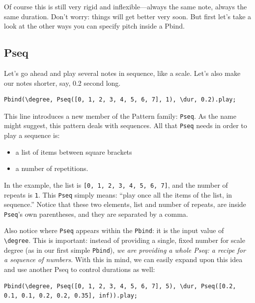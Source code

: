 Of course this is still very rigid and inflexible---always the same note, always the same duration. Don't worry: things will get better very soon. But first let's take a look at the other ways you can specify pitch inside a Pbind.

\subsection{Pseq}

Let's go ahead and play several notes in sequence, like a scale. Let's also make our notes shorter, say, 0.2 second long.
 
\begin{lstlisting}[style=SuperCollider-IDE, basicstyle=\scttfamily\footnotesize]
Pbind(\degree, Pseq([0, 1, 2, 3, 4, 5, 6, 7], 1), \dur, 0.2).play;
\end{lstlisting}

This line introduces a new member of the Pattern family: \texttt{Pseq}. As the name might suggest, this pattern deals with sequences. All that \texttt{Pseq} needs in order to play a sequence is:
\begin{itemize}
\item a list of items between square brackets
\item a number of repetitions.
\end{itemize} 

In the example, the list is \texttt{[0, 1, 2, 3, 4, 5, 6, 7]}, and the number of repeats is \texttt{1}. This \texttt{Pseq} simply means: ``play once all the items of the list, in sequence.'' Notice that these two elements, list and number of repeats, are inside \texttt{Pseq}'s own parentheses, and they are separated by a comma.

Also notice where \texttt{Pseq} appears within the \texttt{Pbind}: it is the input value of \texttt{\textbackslash degree}. This is important: instead of providing a single, fixed number for scale degree (as in our first simple \texttt{Pbind}), \emph{we are providing a whole Pseq: a recipe for a sequence of numbers}. With this in mind, we can easily expand upon this idea and use another Pseq to control durations as well:

 
\begin{lstlisting}[style=SuperCollider-IDE, basicstyle=\scttfamily\footnotesize]
Pbind(\degree, Pseq([0, 1, 2, 3, 4, 5, 6, 7], 5), \dur, Pseq([0.2, 0.1, 0.1, 0.2, 0.2, 0.35], inf)).play;
\end{lstlisting}
 
